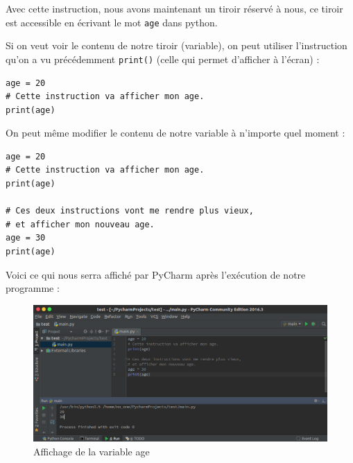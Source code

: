 \documentclass[12pt]{article}
\newcommand{\code}[1]{\colorbox{light-gray}{\texttt{#1}}}
\begin{document}
            Avec cette instruction, nous avons maintenant un tiroir réservé à nous, ce tiroir est accessible en
            écrivant le mot \code{age} dans python.

            Si on veut voir le contenu de notre tiroir (variable), on peut utiliser
            l'instruction qu'on a vu précédemment \code{print()} (celle qui permet d'afficher à l'écran) :
            \begin{lstlisting}[style=code]
age = 20
# Cette instruction va afficher mon age.
print(age)
            \end{lstlisting}

            On peut même modifier le contenu de notre variable à n'importe quel moment :
            \begin{lstlisting}[style=code]
age = 20
# Cette instruction va afficher mon age.
print(age)

# Ces deux instructions vont me rendre plus vieux,
# et afficher mon nouveau age.
age = 30
print(age)
            \end{lstlisting}

            Voici ce qui nous serra affiché par PyCharm après l'exécution de notre programme :

            \begin{figure}[H]
                \centering
                \includegraphics[width=\linewidth]{img/15_affiche_variables.png}
                \caption{Affichage de la variable age}
            \end{figure}
\end{document}
